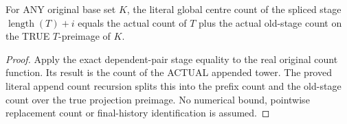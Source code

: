 \begin{lemma}
\label{hir:original-global-prefix-splice-entire-count-dictionary}
\leanok
For ANY original base set $K$, the literal global centre count of the spliced
stage $\operatorname{length}(T)+i$ equals the actual count of $T$ plus the
actual old-stage count on the TRUE $T$-preimage of $K$.
\end{lemma}
\begin{proof}
Apply the exact dependent-pair stage equality to the real original count
function. Its result is the count of the ACTUAL appended tower. The proved
literal append count recursion splits this into the prefix count and the
old-stage count over the true projection preimage. No numerical bound,
pointwise replacement count or final-history identification is assumed.
\end{proof}
